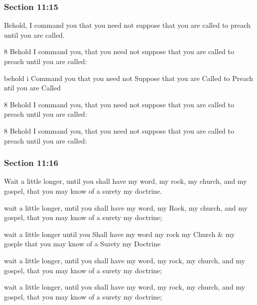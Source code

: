 	\subsubsection{Section 11:15} %
		\label{DC11-15}

		Behold, I command you that you need not suppose that you are called to preach until you are called.

		\begin{framed}
		\scriptsize
			\begin{compactdesc}
				\item[JSP] 8 Behold I command you, that you need not suppose that you are called to preach until you are called:
				\item[HS] behold i Command you that you need not Suppose that you are Called to Preach ntil you are Called 
				\item[DC 1835] 8 Behold I command you, that you need not suppose that you are called to preach until you are called:
				\item[DC 1844] 8 Behold I command you, that you need not suppose that you are called to preach until you are called:
			\end{compactdesc}
		\end{framed}

	\subsubsection{Section 11:16} %
		\label{DC11-16}

		Wait a little longer, until you shall have my word, my rock, my church, and my gospel, that you may know of a surety my doctrine.

		\begin{framed}
		\scriptsize
			\begin{compactdesc}
				\item[JSP] wait a little longer, until you shall have my word, my Rock, my church, and my gospel, that you may know of a surety my doctrine; 
				\item[HS] wait a little longer until you Shall have my word my rock my Church \& my gosple that you may know of a Surety my Doctrine 
				\item[DC 1835] wait a little longer, until you shall have my word, my rock, my church, and my gospel, that you may know of a surety my doctrine; 
				\item[DC 1844] wait a little longer, until you shall have my word, my rock, my church, and my gospel, that you may know of a surety my doctrine; 
			\end{compactdesc}
		\end{framed}

